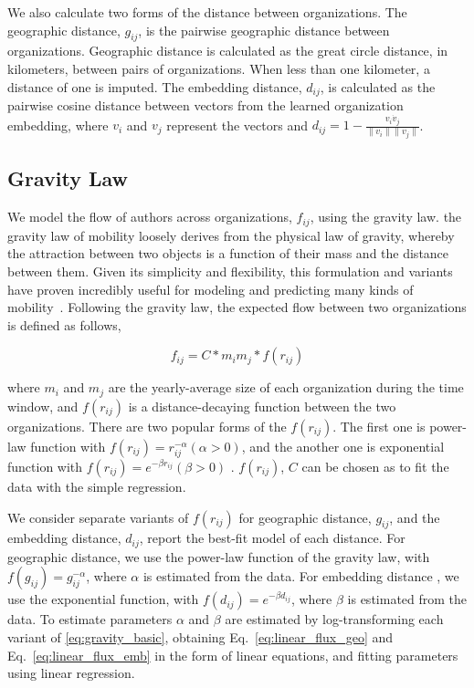 \documentclass[12pt]{article} %
\begin{document}
We also calculate two forms of the distance between organizations.
The geographic distance, $g_{ij}$, is the pairwise geographic distance between organizations.
Geographic distance is calculated as the great circle distance, in kilometers, between pairs of organizations.
When less than one kilometer, a distance of one is imputed.
The embedding distance, $d_{ij}$, is calculated as the pairwise cosine distance between vectors from the learned organization embedding, where $v_{i}$ and $v_{j}$ represent the vectors and $d_{ij} = 1 - \frac{v_{i} \dot v_{j}}{\lVert v_{i} \rVert \lVert v_{j} \rVert}$.

%
%
\subsection{Gravity Law}

We model the flow of authors across organizations, $f_{ij}$, using the gravity law.
the gravity law of mobility loosely derives from the physical law of gravity, whereby the attraction between two objects is a function of their mass and the distance between them.
Given its simplicity and flexibility, this formulation and variants have proven incredibly useful for modeling and predicting many kinds of mobility~\autocite{jung2008highwaygravity, curiel2018citygravity, lewer2008immigrationgravity, xia2005measlesgravity, truscott2012epidemicgravity, hong2016busgravity}.
Following the gravity law, the expected flow between two organizations is defined as follows,

\begin{equation}
    \label{eq:gravity_basic}
    f_{ij} = C*m_{i}m_{j}*f(r_{ij})
\end{equation}

where $m_{i}$ and $m_{j}$ are the yearly-average size of each organization during the time window, and $f(r_{ij})$ is a distance-decaying function  between the two organizations. There are two popular forms of the $f(r_{ij})$. The first one is power-law function with $f(r_{ij})= r^{-\alpha}_{ij}  (\alpha > 0)$, and the another one is exponential function with $f(r_{ij}) = e^{-\beta r_{ij}} (\beta > 0)$ \autocite{chen2015distance}.  $f(r_{ij})$, $C$ can be chosen as to fit the data with the simple regression.

We consider separate variants of $f(r_{ij})$ for geographic distance, $g_{ij}$, and the embedding distance, $d_{ij}$, report the best-fit model of each distance.
For geographic distance, we use the power-law function of the gravity law, with $f(g_{ij})= g^{-\alpha}_{ij}$, where $\alpha$ is estimated from the data.
For embedding distance , we use the exponential function, with $f(d_{ij}) = e^{-\beta d_{ij}}$, where $\beta$ is estimated from the data.
To estimate parameters $\alpha$ and $\beta$ are estimated by log-transforming each variant of \ref{eq:gravity_basic}, obtaining Eq.~\ref{eq:linear_flux_geo} and Eq.~\ref{eq:linear_flux_emb} in the form of linear equations, and fitting parameters using linear regression.
\end{document}
